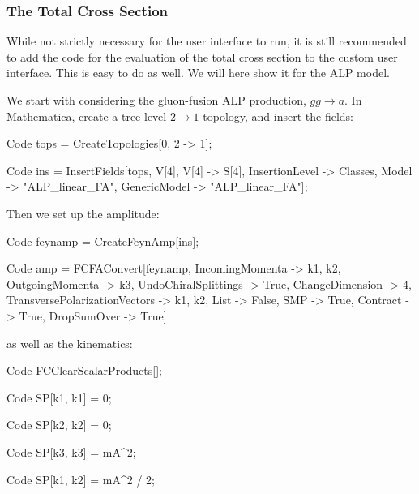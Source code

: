\documentclass[12pt]{article}
\begin{document}
\begin{figure}[tbh]
\begin{minipage}{.485\textwidth}
  \label{fig:alpratio}
\end{minipage}
\end{figure}

\subsubsection{The Total Cross Section} \label{sec:alptotxsec} 
While not strictly necessary for the user interface to run, it is still recommended to add the code for the evaluation of the total cross section to the custom user interface. This is easy to do as well. We will here show it for the ALP model. 

We start with considering the gluon-fusion ALP production, $gg \rightarrow a$. In Mathematica, create a tree-level $2 \rightarrow 1$ topology, and insert the fields: 
\begin{mmaCell}{Code}
tops = CreateTopologies[0, 2 -> 1];
\end{mmaCell}
\begin{mmaCell}{Code}
ins = InsertFields[tops, {V[4], V[4]} -> {S[4]}, InsertionLevel -> {Classes}, Model -> "ALP_linear_FA", GenericModel -> "ALP_linear_FA"];
\end{mmaCell}
Then we set up the amplitude: 
\begin{mmaCell}{Code}
feynamp = CreateFeynAmp[ins]; 
\end{mmaCell}
\begin{mmaCell}{Code}
amp = FCFAConvert[feynamp, IncomingMomenta -> {k1, k2}, 
                  OutgoingMomenta -> {k3}, UndoChiralSplittings -> True, 
                  ChangeDimension -> 4, TransversePolarizationVectors -> {k1, k2}, 
                  List -> False, SMP -> True, Contract -> True, DropSumOver -> True] 
\end{mmaCell}
as well as the kinematics: 
\begin{mmaCell}{Code}
FCClearScalarProducts[]; 
\end{mmaCell}
\begin{mmaCell}{Code}
SP[k1, k1] = 0; 
\end{mmaCell}
\begin{mmaCell}{Code}
SP[k2, k2] = 0; 
\end{mmaCell}
\begin{mmaCell}{Code}
SP[k3, k3] = mA^2; 
\end{mmaCell}
\begin{mmaCell}{Code}
SP[k1, k2] = mA^2 / 2; 
\end{mmaCell}
\end{document}
